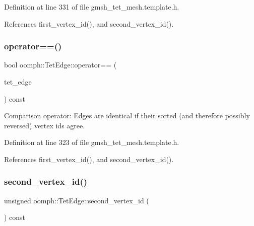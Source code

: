 Definition at line 331 of file gmsh\+\_\+tet\+\_\+mesh.\+template.\+h.



References first\+\_\+vertex\+\_\+id(), and second\+\_\+vertex\+\_\+id().

\mbox{\label{classoomph_1_1TetEdge_a07cbad9bf3e951fcdfab23575c42e379}} 
\subsubsection{\texorpdfstring{operator==()}{operator==()}}
{\footnotesize\ttfamily bool oomph\+::\+Tet\+Edge\+::operator== (\begin{DoxyParamCaption}\item[{const \hyperlink{classoomph_1_1TetEdge}{Tet\+Edge} \&}]{tet\+\_\+edge }\end{DoxyParamCaption}) const\hspace{0.3cm}{\ttfamily [inline]}}



Comparison operator\+: Edges are identical if their sorted (and therefore possibly reversed) vertex ids agree. 



Definition at line 323 of file gmsh\+\_\+tet\+\_\+mesh.\+template.\+h.



References first\+\_\+vertex\+\_\+id(), and second\+\_\+vertex\+\_\+id().

\mbox{\label{classoomph_1_1TetEdge_a5ab63d3dece25fd81b5dad00b7fc8b3f}} 
\subsubsection{\texorpdfstring{second\+\_\+vertex\+\_\+id()}{second\_vertex\_id()}}
{\footnotesize\ttfamily unsigned oomph\+::\+Tet\+Edge\+::second\+\_\+vertex\+\_\+id (\begin{DoxyParamCaption}{ }\end{DoxyParamCaption}) const\hspace{0.3cm}{\ttfamily [inline]}}



